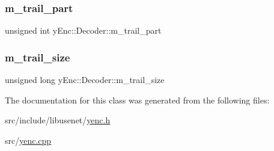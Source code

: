 \subsubsection{\texorpdfstring{m\+\_\+trail\+\_\+part}{m\_trail\_part}}
{\footnotesize\ttfamily unsigned int y\+Enc\+::\+Decoder\+::m\+\_\+trail\+\_\+part\hspace{0.3cm}{\ttfamily [protected]}}

\hypertarget{classy_enc_1_1_decoder_aafc770fbc2a7195c041112572f7ee876}{}\label{classy_enc_1_1_decoder_aafc770fbc2a7195c041112572f7ee876} 
\subsubsection{\texorpdfstring{m\+\_\+trail\+\_\+size}{m\_trail\_size}}
{\footnotesize\ttfamily unsigned long y\+Enc\+::\+Decoder\+::m\+\_\+trail\+\_\+size\hspace{0.3cm}{\ttfamily [protected]}}



The documentation for this class was generated from the following files\+:\begin{DoxyCompactItemize}
\item 
src/include/libusenet/\hyperlink{yenc_8h}{yenc.\+h}\item 
src/\hyperlink{yenc_8cpp}{yenc.\+cpp}\end{DoxyCompactItemize}
